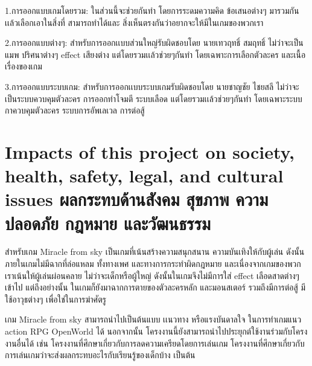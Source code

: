 1.การออกแบบเกมโดยรวม: ในส่วนนี้จะช่วยกันทำ โดยการระดมความคิด ข้อเสนอต่างๆ มารวมกันเเล้วเลือกเอาในสิ่งที่ สามารถทำได้และ สิ่งเห็นตรงกันว่าอยากจะให้มีในเกมของพวกเรา

2.การออกแบบต่างๆ: สำหรับการออกเเบบส่วนใหญ่รับผิดชอบโดย นายเทวฤทธิ์ สมฤทธิ์ ไม่ว่าจะเป็น แมพ ปริศนาต่างๆ effect เสียงต่าง แต่โดยรวมเเล้วช่วยๆกันทำ โดยเฉพาะการเลือกตัวละคร และเนื้อเรื่องของเกม

3.การออกแบบระบบเกม: สำหรับการออกเเบบระบบเกมรับผิดชอบโดย นายชาญชัย ไชยสลี ไม่ว่าจะเป็นระบบควบคุมตัวละคร การออกท่าโจมตี ระบบเลือด แต่โดยรวมเเล้วช่วยๆกันทำ โดยเฉพาะระบบกาควบคุมตัวละคร ระบบการอัพเลเวล การต่อสู้

\section{\ifenglish%
Impacts of this project on society, health, safety, legal, and cultural issues
\else%
ผลกระทบด้านสังคม สุขภาพ ความปลอดภัย กฎหมาย และวัฒนธรรม
\fi}
\enskip \enskip \enskip \enskip \enskip สำหรับเกม Miracle from sky เป็นเกมที่เน้นสร้างความสนุกสนาน ความบันเทิงให้กับผู้เล่น ดังนั้นภายในเกมไม่มีฉากที่ล่อแหลม ทั้งทางเพศ และทางการกระทำผิดกฎหมาย และเนื่องจากเกมของพวกเราเน้นให้ผู้เล่นผ่อนคลาย ไม่ว่าจะเด็กหรือผู้ใหญ่ ดังนั้นในเกมจึงไม่มีการใส่ effect เลือดสาดต่างๆเข้าไป แต่ถึงอย่างนั้น 
ในเกมก็ยังมาฉากการตายของตัวละครหลัก และมอนสเตอร์ รวมถึงมีการต่อสู้ มีใช้อาวุธต่างๆ เพื่อใช่ในการฆ่าศัตรู

\enskip \enskip เกม Miracle from sky สามารถนำไปเป็นต้นแบบ เเนวทาง หรือแรงบันดาลใจ ในการทำเกมแนว action RPG OpenWorld ได้ นอกจากนั้น โครงงานนี้ยังสามารถนำไปประยุกต์ใช้งานร่วมกับโครงงานอื่นได้ เช่น โครงงานที่ศึกษาเกี่ยวกับการลดความเครียดโดยการเล่นเกม โครงงานที่ศึกษาเกี่ยวกับการเล่นเกมว่าจะส่งผลกระทบอะไรกับเรียนรู้ของเด็กบ้าง เป็นต้น


